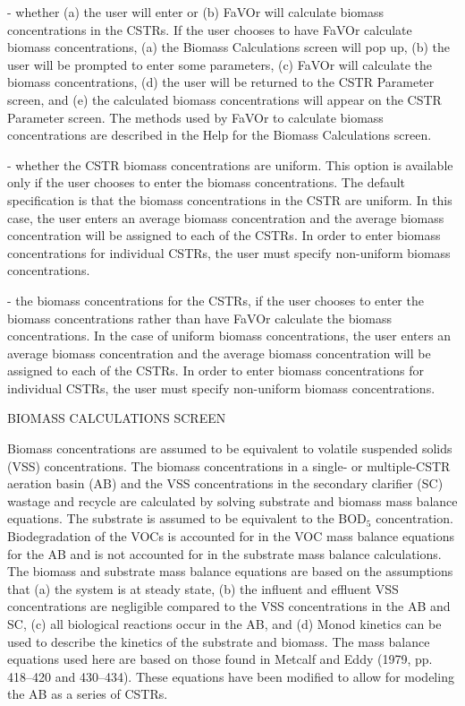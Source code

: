 {\item{-} whether (a) the user will enter or (b) FaVOr will calculate biomass
concentrations in the CSTRs. If the user chooses to have FaVOr calculate
biomass concentrations, (a) the Biomass Calculations screen will pop up, (b)
the user will be prompted to enter some parameters, (c) FaVOr will calculate
the biomass concentrations, (d) the user will be returned to the CSTR Parameter
screen, and (e) the calculated biomass concentrations will appear on the CSTR
Parameter screen.  The methods used by FaVOr to calculate biomass
concentrations are described in the Help for the Biomass Calculations screen.

\item{-} whether the CSTR biomass concentrations are uniform.  This option is
available only if the user chooses to enter the biomass concentrations.  The
default specification is that the biomass concentrations in the CSTR are
uniform.  In this case, the user enters an average biomass concentration and
the average biomass concentration will be assigned to each of the CSTRs. In
order to enter biomass concentrations for individual CSTRs, the user must
specify non-uniform biomass concentrations.  

\item{-} the biomass concentrations for the CSTRs, if the user chooses to enter
the biomass concentrations rather than have FaVOr calculate the biomass
concentrations.  In the case of uniform biomass concentrations, the user enters
an average biomass concentration and the average biomass concentration will be
assigned to each of the CSTRs. In order to enter biomass concentrations for
individual CSTRs, the user must specify non-uniform biomass concentrations.  

}

  


\newpage

BIOMASS CALCULATIONS SCREEN

Biomass concentrations are assumed to be equivalent to volatile suspended
solids (VSS) concentrations. The biomass concentrations in a single- or
multiple-CSTR aeration basin (AB) and the VSS concentrations in the secondary
clarifier (SC) wastage and recycle are calculated by solving substrate and
biomass mass balance equations.  The substrate is assumed to be equivalent to
the BOD$_5$ concentration.  Biodegradation of the VOCs is accounted for in the
VOC mass balance equations for the AB and is not accounted for in the substrate
mass balance calculations.  The biomass and substrate mass balance equations
are based on the assumptions that (a) the system is at steady state, (b) the
influent and effluent VSS concentrations are negligible compared to the VSS
concentrations in the AB and SC, (c) all biological reactions occur in the AB,
and (d) Monod kinetics can be used to describe the kinetics of the substrate
and biomass.  The mass balance equations used here are based on those found in
Metcalf and Eddy (1979, pp. 418--420 and 430--434).  These equations have been
modified to allow for modeling the AB as a series of CSTRs.

